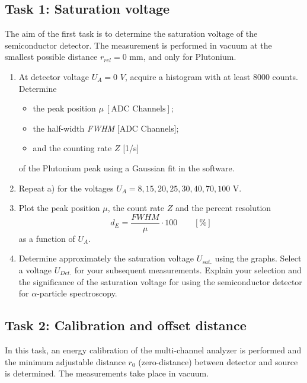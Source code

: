 \subsection{Task 1: Saturation voltage}
The aim of the first task is to determine the saturation voltage of the semiconductor detector. The measurement is performed in vacuum at the smallest possible distance $r_{rel} = 0$ mm, and only for Plutonium.
\begin{enumerate}[label=\textbf{\alph*)}]
	\item At detector voltage $U_A = 0$ $V$, acquire a histogram with at least 8000 counts. Determine 
		\begin{itemize}[nosep]
		\item the peak position $\mu\ [\text{ADC Channels}]$;
		\item the half-width \textit{FWHM} [ADC Channels];
		\item and the counting rate $Z$ [1/s]
	\end{itemize}
	of the Plutonium peak using a Gaussian fit in the software.
	\item Repeat a) for the voltages $U_A = 8, 15, 20, 25, 30, 40, 70, 100$ V.
	\item Plot the peak position $\mu$, the count rate $Z$ and the percent resolution 
		\begin{equation}
			d_E = \frac{\textit{FWHM}}{\mu} \cdot 100 \qquad [\%]
		\end{equation}
	 as a function of $U_A$.
	\item Determine approximately the saturation voltage $U_{sat.}$ using the graphs. Select a voltage $U_{Det.}$ for your subsequent measurements. Explain your selection and the significance of the saturation voltage for using the semiconductor detector for $\alpha$-particle spectroscopy.
\end{enumerate}

\subsection{Task 2: Calibration and offset distance}
In this task, an energy calibration of the multi-channel analyzer is performed and the minimum adjustable distance $r_0$ (zero-distance) between detector and source is determined. The measurements take place in vacuum. 

